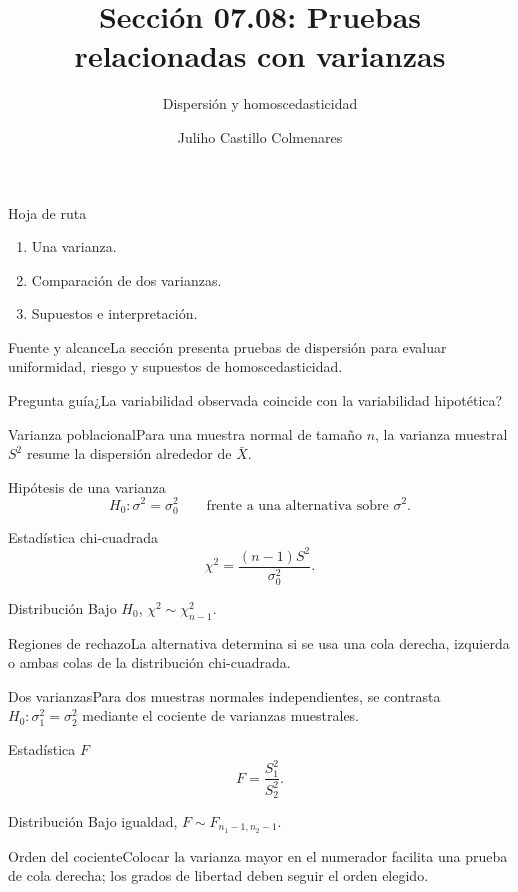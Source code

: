 \documentclass[10pt,aspectratio=169]{beamer}
\title[Pruebas de varianzas]{Sección 07.08: Pruebas relacionadas con varianzas}\subtitle{Dispersión y homoscedasticidad}
\author[J. Castillo Colmenares]{Juliho Castillo Colmenares}\institute{Tecnológico de Monterrey}\date{}
\begin{document}
\begin{frame}[plain]\titlepage\end{frame}
\begin{frame}{Hoja de ruta}\small\begin{enumerate}\item Una varianza.\item Comparación de dos varianzas.\item Supuestos e interpretación.\end{enumerate}\end{frame}
\begin{frame}{Fuente y alcance}\small La sección presenta pruebas de dispersión para evaluar uniformidad, riesgo y supuestos de homoscedasticidad.\begin{block}{Pregunta guía}¿La variabilidad observada coincide con la variabilidad hipotética?\end{block}\end{frame}
\begin{frame}{Varianza poblacional}\small Para una muestra normal de tamaño $n$, la varianza muestral $S^2$ resume la dispersión alrededor de $\bar X$.\end{frame}
\begin{frame}{Hipótesis de una varianza}\small\[H_0:\sigma^2=\sigma_0^2\qquad\text{frente a una alternativa sobre }\sigma^2.\]\end{frame}
\begin{frame}{Estadística chi-cuadrada}\small\[\chi^2=\frac{(n-1)S^2}{\sigma_0^2}.\]\begin{block}{Distribución} Bajo $H_0$, $\chi^2\sim\chi^2_{n-1}$.\end{block}\end{frame}
\begin{frame}{Regiones de rechazo}\small La alternativa determina si se usa una cola derecha, izquierda o ambas colas de la distribución chi-cuadrada.\end{frame}
\begin{frame}{Dos varianzas}\small Para dos muestras normales independientes, se contrasta $H_0:\sigma_1^2=\sigma_2^2$ mediante el cociente de varianzas muestrales.\end{frame}
\begin{frame}{Estadística $F$}\small\[F=\frac{S_1^2}{S_2^2}.\]\begin{block}{Distribución} Bajo igualdad, $F\sim F_{n_1-1,n_2-1}$.\end{block}\end{frame}
\begin{frame}{Orden del cociente}\small Colocar la varianza mayor en el numerador facilita una prueba de cola derecha; los grados de libertad deben seguir el orden elegido.\end{frame}
\end{document}
